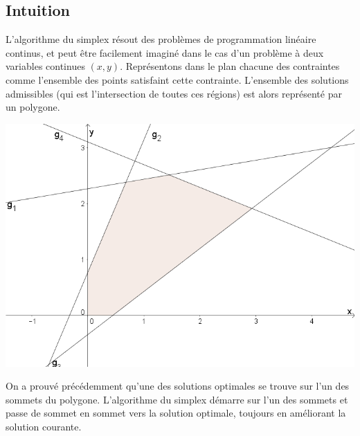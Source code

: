 \documentclass[a4paper]{report}
\theoremstyle{definition}
\theoremstyle{remark}
\theoremstyle{plain}
\begin{document}
\subsection{Intuition}
L'algorithme du simplex résout des problèmes de programmation linéaire continus,
et peut être facilement imaginé dans le cas d'un problème à deux variables
continues \((x,y)\). Représentons dans le plan chacune des contraintes comme
l'ensemble des points satisfaint cette contrainte. L'ensemble des solutions
admissibles (qui est l'intersection de toutes ces régions) est alors représenté
par un polygone.
\begin{center}\textbf{\textbf{}}
\includegraphics[width=\textwidth]{simplex-xy.png}
\end{center}
On a prouvé précédemment qu'une des solutions optimales se trouve sur l'un des
sommets du polygone. L'algorithme du simplex démarre sur l'un des sommets et
passe de sommet en sommet vers la solution optimale, toujours en améliorant la
solution courante.
\end{document}
